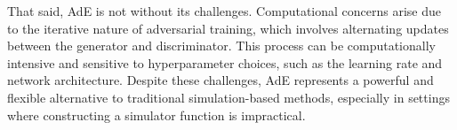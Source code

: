 \documentclass[12pt]{article}
\begin{document}
That said, AdE is not without its challenges. Computational concerns arise due
to the iterative nature of adversarial training, which involves alternating
updates between the generator and discriminator. This process can be
computationally intensive and sensitive to hyperparameter choices, such as the
learning rate and network architecture. Despite these challenges, AdE
represents a powerful and flexible alternative to traditional simulation-based
methods, especially in settings where constructing a simulator function is
impractical.

\pagebreak
\newpage

\end{document}
